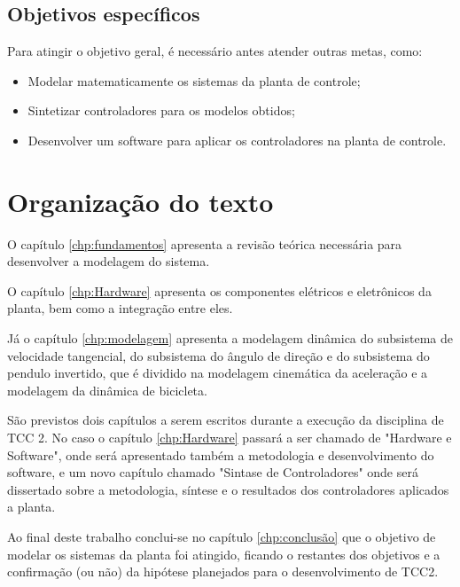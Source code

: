 		\subsection{Objetivos específicos}
		    Para atingir o objetivo geral, é necessário antes atender outras metas, como:
            \begin{itemize} %
                \item Modelar matematicamente os sistemas da planta de controle;
                \item Sintetizar controladores para os modelos obtidos;
                \item Desenvolver um software para aplicar os controladores na planta de controle.
            \end{itemize}
        
	\section{Organização do texto}  %
	    
	    O capítulo \ref{chp:fundamentos} apresenta a revisão teórica necessária para desenvolver a modelagem do sistema.  %
	    
	    O capítulo \ref{chp:Hardware} apresenta os componentes elétricos e eletrônicos da planta, bem como a integração entre eles.
	    
	    Já o capítulo \ref{chp:modelagem} apresenta a modelagem dinâmica do subsistema de velocidade tangencial, do subsistema do ângulo de direção e do subsistema do pendulo invertido, que é dividido na modelagem cinemática da aceleração e a modelagem da dinâmica de bicicleta.
	    
	    São previstos dois capítulos a serem escritos durante a execução da disciplina de TCC 2. No caso o capítulo \ref{chp:Hardware} passará a ser chamado de "Hardware e Software", onde será apresentado também a metodologia e desenvolvimento do software, e um novo capítulo chamado "Sintase de Controladores" onde será dissertado sobre a metodologia, síntese e o resultados dos controladores aplicados a planta.
	    
	    Ao final deste trabalho conclui-se no capítulo \ref{chp:conclusão} que o objetivo de modelar os sistemas da planta foi atingido, ficando o restantes dos objetivos e a confirmação (ou não) da hipótese planejados para o desenvolvimento de TCC2.
	    
	    